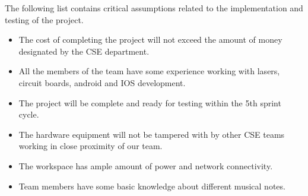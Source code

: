 The following list contains critical assumptions related to the implementation and testing of the project.

\begin{itemize}
  \item The cost of completing the project will not exceed the amount of money designated by the CSE department.
  \item All the members of the team have some experience working with lasers, circuit boards, android and IOS development.
  \item The project will be complete and ready for testing within the 5th sprint cycle.
  \item The hardware equipment will not be tampered with by other CSE teams working in close proximity of our team.
  \item The workspace has ample amount of power and network connectivity.
  \item Team members have some basic knowledge about different musical notes.
\end{itemize}
